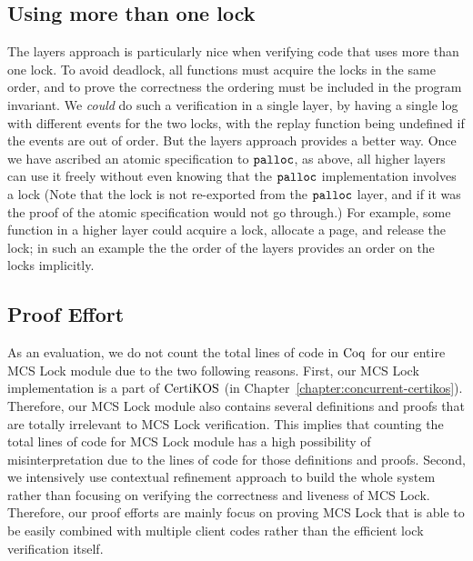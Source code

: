 \subsection{Using more than one lock}

The layers approach is particularly nice when verifying code that uses more than one
lock. To avoid deadlock, all functions must acquire the locks in the
same order, and to prove the correctness the ordering must be
included in the program invariant. We \emph{could} do such a
verification in a single layer, by having a single log with different
events for the two locks, with the replay function being undefined if
the events are out of order. But the layers approach provides a
better way. Once we have ascribed an atomic specification to
${\mathrm{\texttt{palloc}}}$, as above, all higher layers can use it
freely without even knowing that the ${\mathrm{\texttt{palloc}}}$ implementation
involves a lock (Note that the lock is not re-exported from the
${\mathrm{\texttt{palloc}}}$ layer, and if it was the proof of the atomic
specification would not go through.)  For example, some function in a
higher layer could acquire a lock, allocate a page, and release the
lock; in such an example the the order of the layers provides an order
on the locks implicitly.

\subsection{Proof Effort}


As an evaluation, we do not count the total lines of code in $\mathrm{Coq}$ for our entire 
MCS Lock module due to the two following reasons. First, our MCS Lock implementation 
is a part of $\mathrm{CertiKOS}$ (in Chapter~\ref{chapter:concurrent-certikos}). Therefore, our MCS Lock module also contains several definitions 
and proofs that are totally irrelevant to MCS Lock verification. 
This implies that counting the total lines of code for MCS Lock module has a 
high possibility of misinterpretation due to the lines of code for those definitions and proofs.
Second, we intensively use contextual refinement approach to 
build the whole system rather than focusing on verifying the correctness and 
liveness of MCS Lock. Therefore, our proof efforts are mainly focus on proving 
MCS Lock that is able to be easily combined with multiple client codes 
rather than the efficient lock verification itself.  

